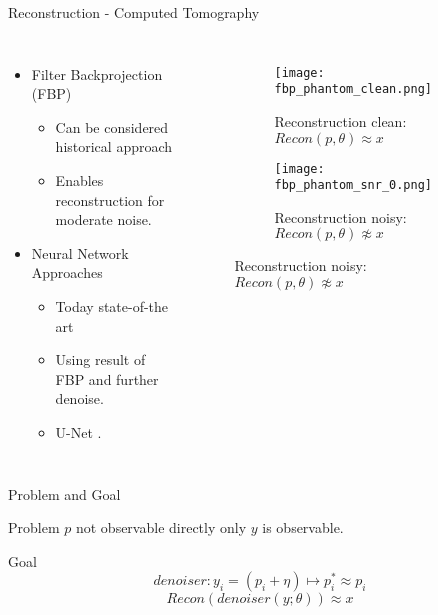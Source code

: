 \begin{frame}{Reconstruction -  Computed Tomography}
    \begin{columns}
        
        \begin{itemize}
            \item Filter Backprojection (FBP)
            \begin{itemize}
                \item Can be considered historical approach
                \item Enables reconstruction for moderate noise.
            \end{itemize}
            \item<2> Neural Network Approaches
            \begin{itemize}
                \item Today state-of-the art
                \item Using result of FBP and further denoise.
                \item U-Net \cite{unet-tomography}.
            \end{itemize}
        \end{itemize}

        \begin{figure}
            \centering
            \begin{subfigure}[t]{0.45\textwidth}
                \texttt{[image: fbp\_phantom\_clean.png]}
                \caption{Reconstruction clean: \\
                    $Recon(p, \theta) \approx x$}
            \end{subfigure}
            \begin{subfigure}[t]{0.45\textwidth}
                \texttt{[image: fbp\_phantom\_snr\_0.png]}
                \caption{Reconstruction noisy: \\
                    $Recon(p, \theta) \not\approx x$}
            \end{subfigure}
        \end{figure}
    \end{columns}

\end{frame}



\begin{frame}{Problem and Goal}
    
    \begin{block}{Problem}
        $p$ not observable directly only $y$ is observable.
    \end{block}

    \begin{block}{Goal}
        $$ denoiser:   y_i = (p_i + \eta) \mapsto p_i^* \approx p_i $$
        $$ \textit{Recon} \left( denoiser(y; \theta) \right) \approx x $$
    \end{block}

\end{frame}


